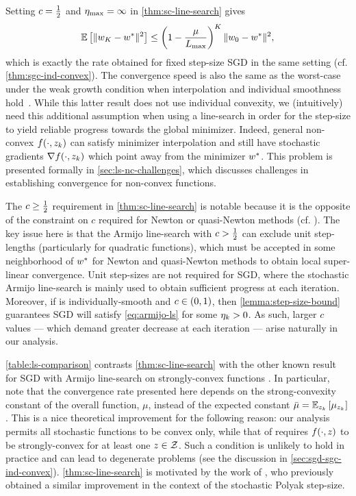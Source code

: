 Setting \( c = \frac 1 2 \) and \( \eta_{\text{max}} = \infty \) in \autoref{thm:sc-line-search} gives  
\[ \mathbb{E}\left[\|w_{K} - w^*\|^2\right] \leq \left(1 - \frac{\mu}{L_{\text{max}}}\right)^K \|w_0 - w^*\|^2, \]
which is exactly the rate obtained for fixed step-size \ac{SGD} in the same setting (cf. \autoref{thm:sgc-ind-convex}). 
The convergence speed is also the same as the worst-case under the weak growth condition when interpolation and individual smoothness hold~\citep[Theorem 5]{vaswani2019fast}.
While this latter result does not use individual convexity, we (intuitively) need this additional assumption when using a line-search in order for the step-size to yield reliable progress towards the global minimizer.
Indeed, general non-convex \( f(\cdot, z_{k}) \) can satisfy minimizer interpolation and still have stochastic gradients \( \nabla f(\cdot, z_{k}) \) which point away from the minimizer \( w^* \).
This problem is presented formally in \autoref{sec:ls-nc-challenges}, which discusses challenges in establishing convergence for non-convex functions.

The \( c \geq \frac 1 2 \) requirement in \autoref{thm:sc-line-search} is notable because it is the opposite of the constraint on \( c \) required for Newton or quasi-Newton methods (cf. \citet[Theorem 3.6]{nocedal1999numerical}). 
The key issue here is that the Armijo line-search with \( c > \frac 1 2 \) can exclude unit step-lengths (particularly for quadratic functions), which must be accepted in some neighborhood of \( w^* \) for Newton and quasi-Newton methods to obtain local super-linear convergence. 
Unit step-sizes are not required for \ac{SGD}, where the stochastic Armijo line-search is mainly used to obtain sufficient progress at each iteration.
Moreover, if \oracle{} is individually-smooth and \( c \in \left(0,1\right) \), then \autoref{lemma:step-size-bound} guarantees \ac{SGD} will satisfy \autoref{eq:armijo-ls} for some \( \eta_k > 0 \).
As such, larger \( c \) values --- which demand greater decrease at each iteration --- arise naturally in our analysis.

\autoref{table:ls-comparison} contrasts \autoref{thm:sc-line-search} with the other known result for \ac{SGD} with Armijo line-search on strongly-convex functions \citep[Theorem 1]{vaswani2019painless}. 
In particular, note that the convergence rate presented here depends on the strong-convexity constant of the overall function, \( \mu \), instead of the expected constant \( \bar \mu = \mathbb{E}_{z_{k}} \left[\mu_{z_{k}}\right] \).
This is a nice theoretical improvement for the following reason: our analysis permits all stochastic functions to be convex only, while that of \citet{vaswani2019painless} requires \( f(\cdot, z) \) to be strongly-convex for at least one \( z \in \mathcal{Z} \).
Such a condition is unlikely to hold in practice and can lead to degenerate problems (see the discussion in \autoref{sec:sgd-sgc-ind-convex}).
\autoref{thm:sc-line-search} is motivated by the work of \citet{loizou2020sps}, who previously obtained a similar improvement in the context of the stochastic Polyak step-size.

